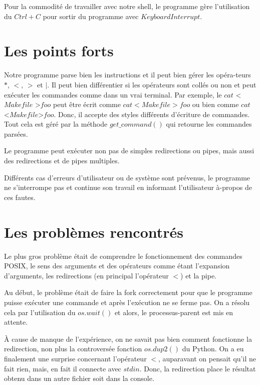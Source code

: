 \documentclass{article}
\begin{document}
Pour la commodité de travailler avec notre shell, le programme gère l’utilisation du $Ctrl+C$ pour sortir du programme avec $KeyboardInterrupt$.

\section*{Les points forts}
Notre programme parse bien les instructions et il peut bien gérer les opéra-teurs $*$, $<$, $>$ et $|$. Il peut bien différentier si les opérateurs sont collés ou non et peut exécuter les commandes comme dans un vrai terminal. Par exemple, le
$cat$ \textless$Makefile$ \textgreater$foo$ peut être écrit comme $cat < Makefile > foo$ ou bien comme $cat$ \textless$Makefile$\textgreater$foo$. Donc, il accepte des styles différents d’écriture de commandes. Tout cela est géré par la méthode $get\_command()$ qui retourne les commandes parsées.

Le programme peut exécuter non pas de simples redirections ou pipes, mais aussi des redirections et de pipes multiples.

Différents cas d’erreurs d’utilisateur ou de système sont prévenus, le programme ne s’interrompe pas et continue son travail en informant l’utilisateur à-propos de ces fautes.
\section*{Les problèmes rencontrés}
Le plus gros problème était de comprendre le fonctionnement des commandes POSIX, le sens des arguments et des opérateurs comme étant l’expansion d’arguments, les redirections (en principal l’opérateur $<$) et la pipe.

Au début, le problème était de faire la fork correctement pour que le programme puisse exécuter une commande et après l’exécution ne se ferme pas. On a résolu cela par l’utilisation du $os.wait()$ et alors, le processus-parent est mis en attente.

À cause de manque de l’expérience, on ne savait pas bien comment fonctionne la redirection, non plus la controversée fonction $os.dup2()$ du Python. On a eu finalement une surprise concernant l’opérateur $<$, auparavant on pensait qu’il ne fait rien, mais, en fait il connecte avec $stdin$. Donc, la redirection place le résultat obtenu dans un autre fichier soit dans la console.
\end{document}
